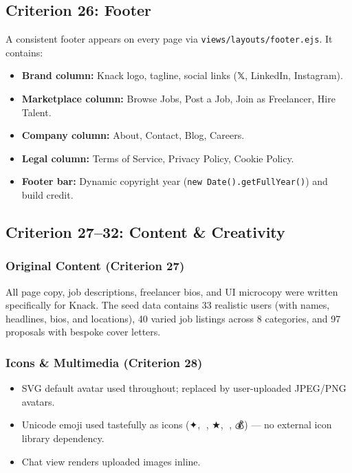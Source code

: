 \documentclass[12pt,a4paper]{article}
\begin{document}
\subsection{Criterion 26: Footer}

A consistent footer appears on every page via \texttt{views/layouts/footer.ejs}. It contains:
\begin{itemize}[noitemsep]
  \item \textbf{Brand column:} Knack logo, tagline, social links (𝕏, LinkedIn, Instagram).
  \item \textbf{Marketplace column:} Browse Jobs, Post a Job, Join as Freelancer, Hire Talent.
  \item \textbf{Company column:} About, Contact, Blog, Careers.
  \item \textbf{Legal column:} Terms of Service, Privacy Policy, Cookie Policy.
  \item \textbf{Footer bar:} Dynamic copyright year (\texttt{new Date().getFullYear()}) and build credit.
\end{itemize}

\subsection{Criterion 27--32: Content \& Creativity}

\subsubsection{Original Content (Criterion 27)}

All page copy, job descriptions, freelancer bios, and UI microcopy were written specifically for Knack. The seed data contains 33 realistic users (with names, headlines, bios, and locations), 40 varied job listings across 8 categories, and 97 proposals with bespoke cover letters.

\subsubsection{Icons \& Multimedia (Criterion 28)}

\begin{itemize}[noitemsep]
  \item SVG default avatar used throughout; replaced by user-uploaded JPEG/PNG avatars.
  \item Unicode emoji used tastefully as icons (✦, 💬, ★, 📅, 💰) --- no external icon library dependency.
  \item Chat view renders uploaded images inline.
\end{itemize}
\end{document}

